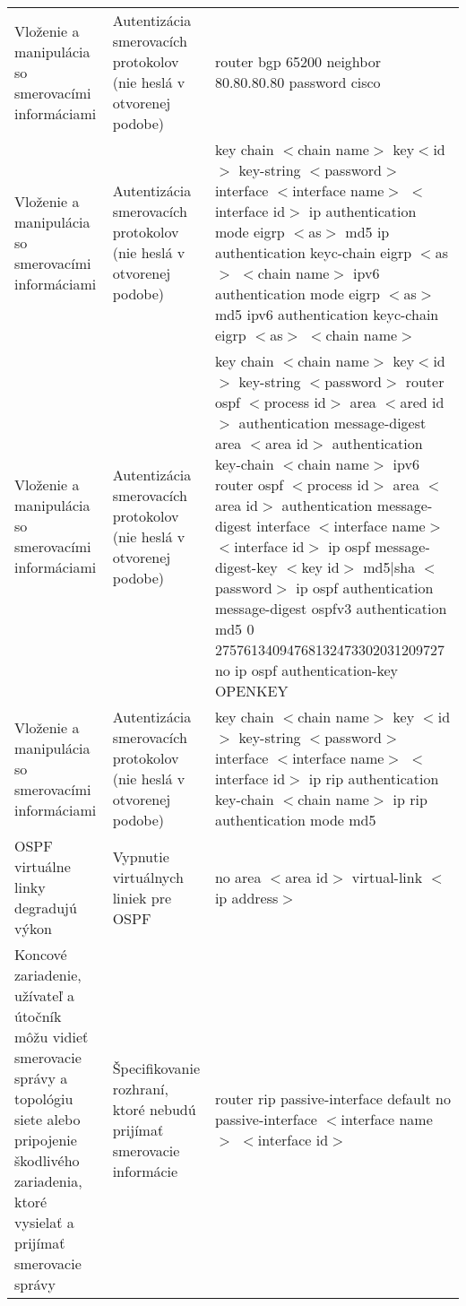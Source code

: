 \begin{longtable}[!htbp]{|L{10em}L{10em}L{34em}|}
	
	Vloženie a manipulácia so smerovacími informáciami	&Autentizácia smerovacích protokolov (nie heslá v otvorenej podobe)	&router bgp 65200
	neighbor 80.80.80.80 password cisco   \\
	
	
	
	
	 Vloženie a manipulácia so smerovacími informáciami	&Autentizácia smerovacích protokolov (nie heslá v otvorenej podobe)	&key chain $<$chain name$>$
	key$<$id$>$
	key-string $<$password$>$
	interface $<$interface name$>$ $<$interface id$>$
	ip authentication mode eigrp $<$as$>$ md5
	ip authentication keyc-chain eigrp $<$as$>$ $<$chain name$>$
	ipv6 authentication mode eigrp $<$as$>$ md5
	ipv6 authentication keyc-chain eigrp $<$as$>$ $<$chain name$>$\\
	
	
	
	
	Vloženie a manipulácia so smerovacími informáciami	&Autentizácia smerovacích protokolov (nie heslá v otvorenej podobe)	&key chain $<$chain name$>$
	key$<$id$>$
	key-string $<$password$>$
	router ospf $<$process id$>$
	area $<$ared id$>$ authentication message-digest
	area $<$area id$>$ authentication key-chain $<$chain name$>$
	ipv6 router ospf $<$process id$>$
	area $<$area id$>$ authentication message-digest
	interface $<$interface name$>$ $<$interface id$>$
	ip ospf message-digest-key $<$key id$>$ md5|sha $<$password$>$
	ip ospf authentication message-digest
	ospfv3 authentication md5 0 27576134094768132473302031209727
	no ip ospf authentication-key OPENKEY\\
	
	
	
	
	 Vloženie a manipulácia so smerovacími informáciami	&Autentizácia smerovacích protokolov (nie heslá v otvorenej podobe)	&key chain $<$chain name$>$
	key $<$id$>$
	key-string $<$password$>$
	interface $<$interface name$>$ $<$interface id$>$
	ip rip authentication key-chain $<$chain name$>$
	ip rip authentication mode md5\\
	
	
	
	
	OSPF virtuálne linky degradujú výkon	&Vypnutie virtuálnych liniek pre OSPF	&no area $<$area id$>$ virtual-link $<$ip address$>$\\
	
	
	
	 Koncové zariadenie, užívateľ a útočník môžu vidieť smerovacie správy a topológiu siete alebo pripojenie škodlivého zariadenia, ktoré vysielať a prijímať smerovacie správy	&Špecifikovanie rozhraní, ktoré nebudú prijímať smerovacie informácie	&router rip
	passive-interface default
	no passive-interface $<$interface name$>$ $<$interface id$>$
	

\end{longtable}
